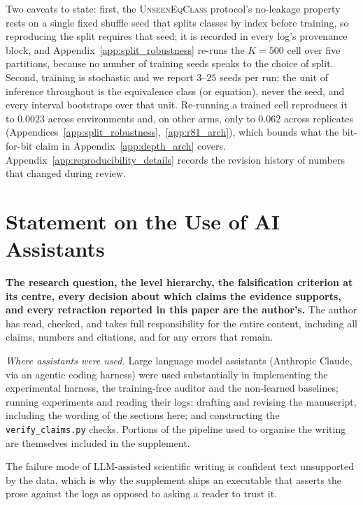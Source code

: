 Two caveats to state: first, the \textsc{UnseenEqClass} protocol's no-leakage property rests on a single fixed shuffle seed that splits classes by index before training, so reproducing the split requires that seed; it is recorded in every log's provenance block, and Appendix~\ref{app:split_robustness} re-runs the $K{=}500$ cell over five partitions, because no number of training seeds speaks to the choice of split. Second, training is stochastic and we report $3$--$25$ seeds per run; the unit of inference throughout is the equivalence class (or equation), never the seed, and every interval bootstraps over that unit. Re-running a trained cell reproduces it to $0.0023$ across environments and, on other arms, only to $0.062$ across replicates (Appendices~\ref{app:split_robustness},~\ref{app:r81_arch}), which bounds what the bit-for-bit claim in Appendix~\ref{app:depth_arch} covers. Appendix~\ref{app:reproducibility_details} records the revision history of numbers that changed during review.

\section*{Statement on the Use of AI Assistants}

\textbf{The research question, the level hierarchy, the falsification criterion at its centre, every decision about which claims the evidence supports, and every retraction reported in this paper are the author's.} The author has read, checked, and takes full responsibility for the entire content, including all claims, numbers and citations, and for any errors that remain.

\emph{Where assistants were used.} Large language model assistants (Anthropic Claude, via an agentic coding harness) were used substantially in implementing the experimental harness, the training-free auditor and the non-learned baselines; running experiments and reading their logs; drafting and revising the manuscript, including the wording of the sections here; and constructing the \texttt{verify\_claims.py} checks. Portions of the pipeline used to organise the writing are themselves included in the supplement.

The failure mode of LLM-assisted scientific writing is confident text unsupported by the data, which is why the supplement ships an executable that asserts the prose against the logs as opposed to asking a reader to trust it.
